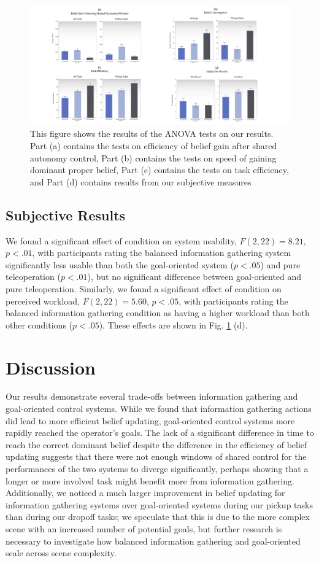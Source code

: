 \documentclass[conference]{IEEEtran}
\begin{document}
\begin{figure}
\includegraphics[width=\textwidth]{figures/All_Measures.pdf}
\caption{This figure shows the results of the ANOVA tests on our results. Part (a) contains the tests on efficiency of belief gain after shared autonomy control, Part (b) contains the tests on speed of gaining dominant proper belief, Part (c) contains the tests on task efficiency, and Part (d) contains results from our subjective measures}
\label{picture_results}
\end{figure}

\subsection{Subjective Results}

We found a significant effect of condition on system usability, $F(2, 22) = 8.21$, $p < .01$, with participants rating the balanced information gathering system significantly less usable than both the goal-oriented system ($p < .05$) and pure teleoperation ($p < .01$), but no significant difference between goal-oriented and pure teleoperation. Similarly, we found a significant effect of condition on perceived workload, $F(2, 22) = 5.60$, $p < .05$, with participants rating the balanced information gathering condition as having a higher workload than both other conditions ($p < .05$). These effects are shown in Fig. \ref{picture_results} (d).

\section{Discussion}
Our results demonstrate several trade-offs between information gathering and goal-oriented control systems. While we found that information gathering actions did lead to more efficient belief updating, goal-oriented control systems more rapidly reached the operator's goals. The lack of a significant difference in time to reach the correct dominant belief despite the difference in the efficiency of belief updating suggests that there were not enough windows of shared control for the performances of the two systems to diverge significantly, perhaps showing that a longer or more involved task might benefit more from information gathering. Additionally, we noticed a much larger improvement in belief updating for information gathering systems over goal-oriented systems during our pickup tasks than during our dropoff tasks; we speculate that this is due to the more complex scene with an increased number of potential goals, but further research is necessary to investigate how balanced information gathering and goal-oriented scale across scene complexity.
\end{document}
